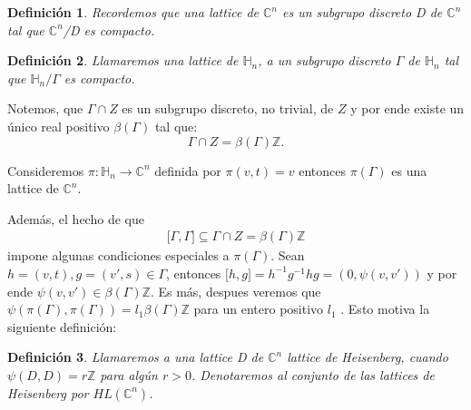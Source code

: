 \documentclass[12pt]{article}
\newtheorem{definition}{Definición}
\begin{document}
\begin{definition}
 Recordemos que una lattice de $\mathbb{C}^n$ es un subgrupo discreto D de $\mathbb{C}^n$ tal que $\mathbb{C}^n$/D es compacto.
\end{definition}

\begin{definition}
 Llamaremos una lattice de $\mathbb{H}_n$, a un subgrupo discreto $\Gamma$ de $\mathbb{H}_n$ tal que $\mathbb{H}_n/\Gamma$ es compacto.
\end{definition}

Notemos, que  $\Gamma \cap Z$ es un subgrupo discreto, no trivial, de $Z$ y 
por ende existe un único real positivo $\beta(\Gamma)$ tal que:
$$
\Gamma \cap Z=\beta(\Gamma) \mathbb{Z}.
$$

Consideremos $\pi :\mathbb{H}_{n}\rightarrow \mathbb{C}^{n}$  definida por $\pi (v,t)=v$
entonces $\pi(\Gamma)$ es una lattice de $\mathbb{C}^n$.

Además, el hecho de que
$$\begin{aligned}
{[} \Gamma,\Gamma {]} \subseteq \Gamma \cap Z = \beta(\Gamma) \mathbb{Z}
\end{aligned}$$
impone algunas condiciones especiales a $\pi(\Gamma)$.
Sean $h=(v,t),g=(v',s) \in \Gamma$, entonces ${[}h,g{]}=h^{-1}g^{-1}hg=(0,\psi(v,v'))$ 
y por ende $\psi(v,v') \in  \beta(\Gamma) \mathbb{Z}$.
Es más, despues veremos que $\psi(\pi(\Gamma),\pi(\Gamma))=l_1 \beta(\Gamma) \mathbb{Z}$ para un entero positivo $l_1$ .
Esto motiva la siguiente definición:

\begin{definition}
 Llamaremos a una lattice D de $\mathbb{C}^n$ lattice de Heisenberg, cuando $\psi(D,D)=r \mathbb{Z} $ para algún $r > 0$.
 Denotaremos al conjunto de las lattices de Heisenberg  por $HL(\mathbb{C}^n)$.
\end{definition}
\end{document}
